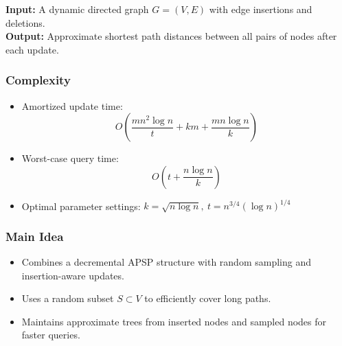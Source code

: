 \documentclass[11pt]{article}
\begin{document}
\textbf{Input:} A dynamic directed graph \( G = (V, E) \) with edge insertions and deletions.\\
\textbf{Output:} Approximate shortest path distances between all pairs of nodes after each update.

\subsubsection*{Complexity}
\begin{itemize}
    \item Amortized update time: 
    \[
    O\left(\frac{mn^2 \log n}{t} + km + \frac{mn \log n}{k}\right)
    \]
    \item Worst-case query time:
    \[
    O\left(t + \frac{n \log n}{k}\right)
    \]
    \item Optimal parameter settings: \(k = \sqrt{n \log n},\ t = n^{3/4} (\log n)^{1/4}\)
\end{itemize}

\subsubsection*{Main Idea}
\begin{itemize}
    \item Combines a decremental APSP structure with random sampling and insertion-aware updates.
    \item Uses a random subset \( S \subset V \) to efficiently cover long paths.
    \item Maintains approximate trees from inserted nodes and sampled nodes for faster queries.
\end{itemize}
\end{document}
